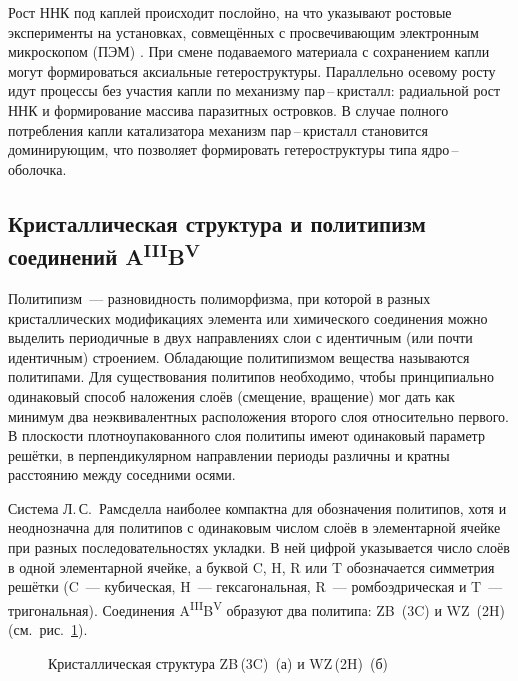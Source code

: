 Рост ННК под каплей происходит послойно, на что указывают ростовые эксперименты
на установках, совмещённых с просвечивающим электронным микроскопом (ПЭМ)
\cite{Hofmann2008, Wen2009, Jacobsson2016}. При смене подаваемого материала с
сохранением капли могут формироваться аксиальные гетероструктуры. Параллельно
осевому росту идут процессы без участия капли по механизму пар\,--\,кристалл:
радиальной рост ННК и формирование массива паразитных островков. В случае
полного потребления капли катализатора механизм пар\,--\,кристалл становится
доминирующим, что позволяет формировать гетероструктуры типа
ядро\,--\,оболочка.

\subsection{Кристаллическая структура и политипизм соединений
A\textsuperscript{III}B\textsuperscript{V}}\label{subsec:ch1/sec2/sub3}

Политипизм~--- разновидность полиморфизма, при которой в разных кристаллических
модификациях элемента или химического соединения можно выделить периодичные в
двух направлениях слои с идентичным (или почти идентичным) строением.
Обладающие политипизмом вещества называются политипами. Для существования
политипов необходимо, чтобы принципиально одинаковый способ наложения слоёв
(смещение, вращение) мог дать как минимум два неэквивалентных расположения
второго слоя относительно первого. В плоскости плотноупакованного слоя политипы
имеют одинаковый параметр решётки, в перпендикулярном направлении периоды
различны и кратны расстоянию между соседними осями.

Система Л.\,С.~Рамсделла наиболее компактна для обозначения политипов, хотя и
неоднозначна для политипов с одинаковым числом слоёв в элементарной ячейке при
разных последовательностях укладки. В ней цифрой указывается число слоёв в
одной элементарной ячейке, а буквой C, H, R или T обозначается симметрия
решётки (C~--- кубическая, H~--- гексагональная, R~--- ромбоэдрическая и T~---
тригональная). Соединения A\textsuperscript{III}B\textsuperscript{V} образуют
два политипа: ZB~(3C) и WZ~(2H) (см.~рис.~\cref{fig:Image_5}).

\begin{figure}[ht] 
			\caption{Кристаллическая структура ZB\,(3C)~(а) и
		WZ\,(2H)~(б)}\label{fig:Image_5} \end{figure}

